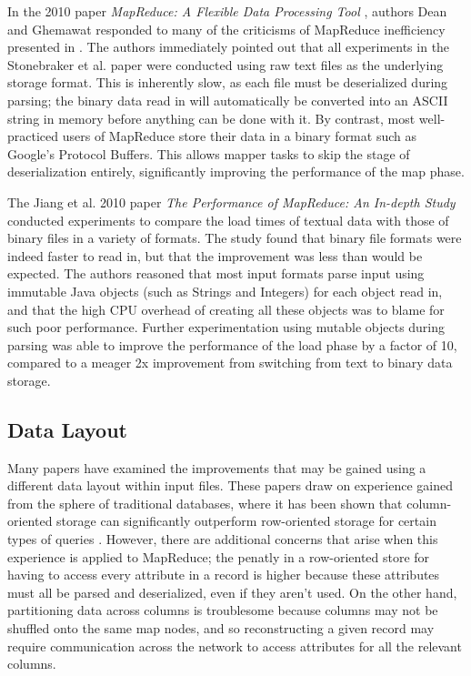 \documentclass[twocolumn]{article}
\begin{document}
In the 2010 paper \emph{MapReduce: A Flexible Data Processing Tool} \cite{ref:friends-or-foes-resp},
authors Dean and Ghemawat responded to many of the criticisms of MapReduce inefficiency
presented in \cite{ref:friends-or-foes}.  The authors immediately pointed out that all experiments
in the Stonebraker et al. paper were conducted using raw text files as the underlying storage
format.  This is inherently slow, as each file must be deserialized during parsing; the binary
data read in will automatically be converted into an ASCII string in memory before anything can
be done with it.  By contrast, most well-practiced users of MapReduce store their data in a binary
format such as Google's Protocol Buffers.
This allows mapper tasks to skip the stage of deserialization entirely, significantly
improving the performance of the map phase.

The Jiang et al. 2010 paper \emph{The Performance of MapReduce: An In-depth Study}
\cite{ref:perf-study} conducted experiments to compare
the load times of textual data with those of binary files in a variety of formats.
The study found that binary file formats were indeed faster to read in, but that the
improvement was less than would be expected.  The authors reasoned that most input formats
parse input using immutable Java objects (such as Strings and Integers) for each object
read in, and that the high CPU overhead of creating all
these objects was to blame for such poor performance.  Further experimentation
using mutable objects during parsing was able to improve the performance of the load phase
by a factor of 10, compared to a meager 2x improvement from switching from text to binary
data storage.

\subsection{Data Layout}

Many papers have examined the improvements that may be gained using a different
data layout within input files.  These papers draw on experience gained from 
the sphere of traditional databases, where it has been shown that column-oriented
storage can significantly outperform row-oriented storage for
certain types of queries \cite{ref:colstores}.  However, there are additional
concerns that arise when this experience is applied to MapReduce; the penatly
in a row-oriented store for having to access every attribute in a record is higher because
these attributes must all be parsed and deserialized, even if they aren't used.
On the other hand, partitioning data across columns is troublesome because 
columns may not be shuffled onto the same map nodes, and so reconstructing
a given record may require communication across the network to access attributes
for all the relevant columns.
\end{document}
